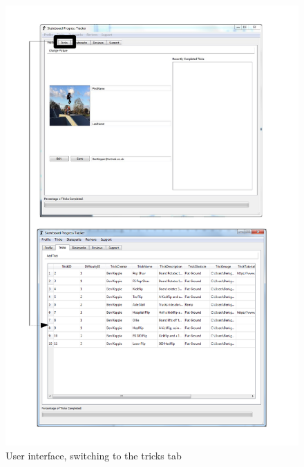 \begin{figure}[H]
    \includegraphics[width=\textwidth]{./Maintenance/Figures/TricksTab.pdf}
    \caption{User interface, switching to the tricks tab} \label{fig:Trick Tab UI}
\end{figure}



